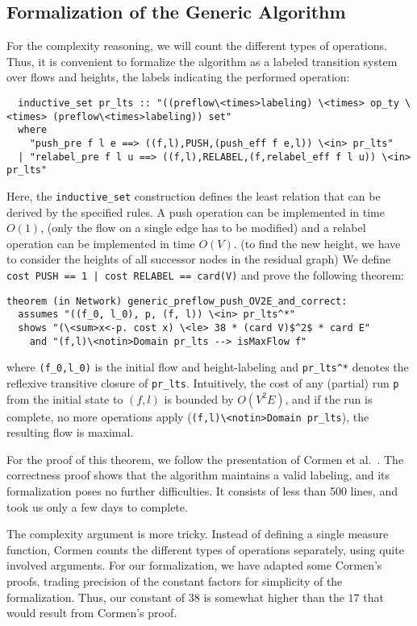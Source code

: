 \documentclass[smallcondensed]{svjour3}     %
\newcommand{\isai}{\lstinline[language=isabelle,basicstyle=\normalsize\ttfamily\slshape]}
\begin{document}
\subsection{Formalization of the Generic Algorithm}
For the complexity reasoning, we will count the different types of operations. Thus, it is convenient to formalize the algorithm as a labeled transition system
over flows and heights, the labels indicating the performed operation:
\begin{lstlisting}
  inductive_set pr_lts :: "((preflow\<times>labeling) \<times> op_ty \<times> (preflow\<times>labeling)) set" 
  where
    "push_pre f l e ==> ((f,l),PUSH,(push_eff f e,l)) \<in> pr_lts"
  | "relabel_pre f l u ==> ((f,l),RELABEL,(f,relabel_eff f l u)) \<in> pr_lts"
\end{lstlisting}  
Here, the \isai{inductive_set} construction defines the least relation that can be derived by the specified rules. 
A push operation can be implemented in time $O(1)$, (only the flow on a single edge has to be modified) and a relabel operation can be implemented in time $O(V)$.
(to find the new height, we have to consider the heights of all successor nodes in the residual graph) We define 
\isai{cost PUSH == 1 | cost RELABEL == card(V)} and prove the following theorem:
\begin{lstlisting}
theorem (in Network) generic_preflow_push_OV2E_and_correct:
  assumes "((f_0, l_0), p, (f, l)) \<in> pr_lts^*" 
  shows "(\<sum>x<-p. cost x) \<le> 38 * (card V)$^2$ * card E"
    and "(f,l)\<notin>Domain pr_lts --> isMaxFlow f"
\end{lstlisting}  
where \isai$(f_0,l_0)$ is the initial flow and height-labeling and \isai{pr_lts^*} denotes the reflexive transitive closure of \isai{pr_lts}. 
Intuitively, the cost of any (partial) run \isai$p$ from the initial state to $(f,l)$ is bounded by $O(V^2E)$, and if the 
run is complete, \ie no more operations apply (\isai$(f,l)\<notin>Domain pr_lts$), the resulting flow is maximal. 

For the proof of this theorem, we follow the presentation of Cormen et al.~\cite{CLRS09}.
The correctness proof shows that the algorithm maintains a valid labeling, and its formalization poses no further difficulties. 
It consists of less than 500 lines, and took us only a few days to complete.

The complexity argument is more tricky. Instead of defining a single measure function,
Cormen counts the different types of operations separately, using quite involved arguments.
For our formalization, we have adapted some Cormen's proofs, trading precision of the constant factors for simplicity of the formalization. 
Thus, our constant of $38$ is somewhat higher than the $17$ that would result from Cormen's proof.
\end{document}
